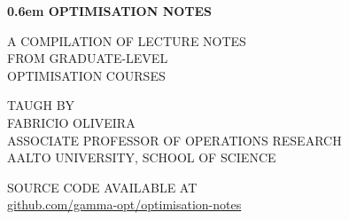 \newcommand\nbvspace[1][3]{\vspace*{\stretch{#1}}}

\newcommand\nbstretchyspace{\spaceskip0.5em plus 0.25em minus 0.25em}

\newcommand{\nbtitlestretch}{\spaceskip0.6em}

\thispagestyle{empty}

\begin{center}
	\bfseries
	\nbvspace[1]
	\Huge
	{\nbtitlestretch\huge
	OPTIMISATION NOTES}
	
	\nbvspace[1]
	\normalsize
	
	A COMPILATION OF LECTURE NOTES \\
	FROM GRADUATE-LEVEL \\
	OPTIMISATION COURSES 
	
	\nbvspace[1]
	\small TAUGH BY\\
	\Large FABRICIO OLIVEIRA\\[0.5em]
	\footnotesize ASSOCIATE PROFESSOR OF OPERATIONS RESEARCH\\
	AALTO UNIVERSITY, SCHOOL OF SCIENCE
	
	\nbvspace[2]
	
	
	
	\normalsize
	
	SOURCE CODE AVAILABLE AT\\
	
	\large
	{\color{blue}\href{https://github.com/gamma-opt/optimisation-notes}{github.com/gamma-opt/optimisation-notes}}
	
	\nbvspace[1]
\end{center}



